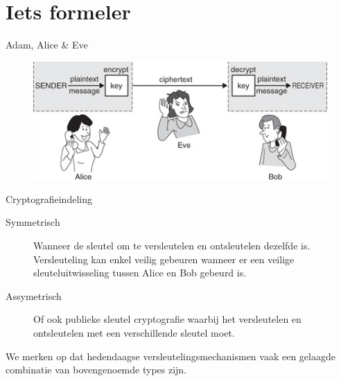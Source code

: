 \documentclass{beamer}
\begin{document}
\section{Iets formeler}

\begin{frame}{Adam, Alice \& Eve}
	\begin{figure}
		\includegraphics[width=\textwidth]{img/adameve.jpg}
	\end{figure}
\end{frame}

\begin{frame}{Cryptografieindeling}
	\begin{description}
		\item[Symmetrisch] Wanneer de sleutel om te versleutelen en ontsleutelen dezelfde is. Versleuteling kan enkel veilig gebeuren wanneer er een veilige sleuteluitwisseling tussen Alice en Bob gebeurd is.
	\item[Assymetrisch] Of ook publieke sleutel cryptografie waarbij het versleutelen en ontsleutelen met een verschillende sleutel moet. 
\end{description}
We merken op dat hedendaagse versleutelingsmechanismen vaak een gelaagde combinatie van bovengenoemde types zijn.
\end{frame}
\end{document}
